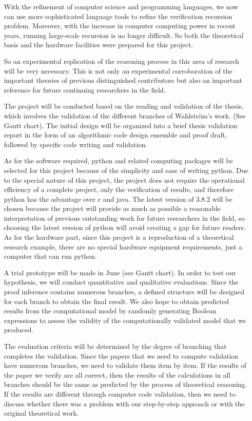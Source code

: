 \documentclass{sigchi}
\begin{document}
With the refinement of computer science and programming languages, we now can use more sophisticated language tools to refine the verification recursion problem. Moreover, with the increase in computer computing power in recent years, running large-scale recursion is no longer difficult. So both the theoretical basis and the hardware facilities were prepared for this project.

So an experimental replication of the reasoning process in this area of research will be very necessary. This is not only an experimental corroboration of the important theories of previous distinguished contributors but also an important reference for future continuing researchers in the field.

The project will be conducted based on the reading and validation of the thesis, which involves the validation of the different branches of Wahlström's work. (See Gantt chart). The initial design will be organized into a brief thesis validation report in the form of an algorithmic code design ensemble and proof draft, followed by specific code writing and validation.

As for the software required, python and related computing packages will be selected for this project because of the simplicity and ease of writing python. Due to the special nature of this project, the project does not require the operational efficiency of a complete project, only the verification of results, and therefore python has the advantage over c and java. The latest version of 3.8.2 will be chosen because the project will provide as much as possible a reasonable interpretation of previous outstanding work for future researchers in the field, so choosing the latest version of python will avoid creating a gap for future readers. As for the hardware part, since this project is a reproduction of a theoretical research example, there are no special hardware equipment requirements, just a computer that can run python.

A trial prototype will be made in June (see Gantt chart). In order to test our hypothesis, we will conduct quantitative and qualitative evaluations. Since the proof inference contains numerous branches, a defined structure will be designed for each branch to obtain the final result. We also hope to obtain predicted results from the computational model by randomly generating Boolean expressions to assess the validity of the computationally validated model that we produced.

The evaluation criteria will be determined by the degree of branching that completes the validation. Since the papers that we need to compute validation have numerous branches, we need to validate them item by item. If the results of the paper we verify are all correct, then the results of the calculations in all branches should be the same as predicted by the process of theoretical reasoning. If the results are different through computer code validation, then we need to discuss whether there was a problem with our step-by-step approach or with the original theoretical work.
\end{document}
